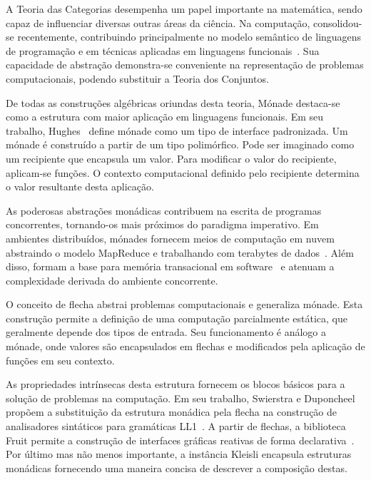\documentclass[10pt, conference]{IEEEtran}
\begin{document}
A Teoria das Categorias desempenha um papel importante na matemática, sendo capaz de influenciar diversas outras áreas da ciência. Na computação, consolidou-se recentemente, contribuindo principalmente no modelo semântico de linguagens de programação e em técnicas aplicadas em linguagens funcionais~\cite{pierce1990taste, carlos2006caracteristicas}. Sua capacidade de abstração demonstra-se conveniente na representação de problemas computacionais, podendo substituir a Teoria dos Conjuntos.

De todas as construções algébricas oriundas desta teoria, Mónade destaca-se como a estrutura com maior aplicação em linguagens funcionais. Em seu trabalho, Hughes~\cite{hughes2000generalising} define mónade como um tipo de interface padronizada. Um mónade é construído a partir de um tipo polimórfico. Pode ser imaginado como um recipiente que encapsula um valor. Para modificar o valor do recipiente, aplicam-se funções. O contexto computacional definido pelo recipiente determina o valor resultante desta aplicação.

As poderosas abstrações monádicas contribuem na escrita de programas concorrentes, tornando-os mais próximos do paradigma imperativo. Em ambientes distribuídos, mónades fornecem meios de computação em nuvem abstraindo o modelo MapReduce e trabalhando com terabytes de dados~\cite{dean2008mapreduce, dzik2013mbrace}. Além disso, formam a base para memória transacional em software~\cite{jones2007beautiful} e atenuam a complexidade derivada do ambiente concorrente.

O conceito de flecha abstrai problemas computacionais e generaliza mónade. Esta construção permite a definição de uma computação parcialmente estática, que geralmente depende dos tipos de entrada. Seu funcionamento é análogo a mónade, onde valores são encapsulados em flechas e modificados pela aplicação de funções em seu contexto.

As propriedades intrínsecas desta estrutura fornecem os blocos básicos para a solução de problemas na computação. Em seu trabalho, Swierstra e Duponcheel propõem a substituição da estrutura monádica pela flecha na construção de analisadores sintáticos para gramáticas LL1~\cite{swierstra1996deterministic}. A partir de flechas, a biblioteca Fruit permite a construção de interfaces gráficas reativas de forma declarativa~\cite{courtney2001genuinely, courtney2003yampa}. Por último mas não menos importante, a instância Kleisli encapsula estruturas monádicas fornecendo uma maneira concisa de descrever a composição destas.
\end{document}
